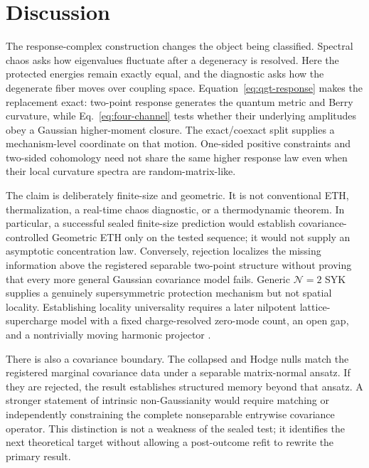 \section{Discussion}
\label{sec:discussion}

The response-complex construction changes the object being classified. Spectral chaos asks how eigenvalues fluctuate after a degeneracy is resolved. Here the protected energies remain exactly equal, and the diagnostic asks how the degenerate fiber moves over coupling space. Equation~\eqref{eq:qgt-response} makes the replacement exact: two-point response generates the quantum metric and Berry curvature, while Eq.~\eqref{eq:four-channel} tests whether their underlying amplitudes obey a Gaussian higher-moment closure. The exact/coexact split supplies a mechanism-level coordinate on that motion. One-sided positive constraints and two-sided cohomology need not share the same higher response law even when their local curvature spectra are random-matrix-like.

The claim is deliberately finite-size and geometric. It is not conventional ETH, thermalization, a real-time chaos diagnostic, or a thermodynamic theorem. In particular, a successful sealed finite-size prediction would establish covariance-controlled Geometric ETH only on the tested sequence; it would not supply an asymptotic concentration law. Conversely, rejection localizes the missing information above the registered separable two-point structure without proving that every more general Gaussian covariance model fails. Generic \(\mathcal N=2\) SYK supplies a genuinely supersymmetric protection mechanism but not spatial locality. Establishing locality universality requires a later nilpotent lattice-supercharge model with a fixed charge-resolved zero-mode count, an open gap, and a nontrivially moving harmonic projector \cite{huijse2009cohomology,zhang2024local}.

There is also a covariance boundary. The collapsed and Hodge nulls match the registered marginal covariance data under a separable matrix-normal ansatz. If they are rejected, the result establishes structured memory beyond that ansatz. A stronger statement of intrinsic non-Gaussianity would require matching or independently constraining the complete nonseparable entrywise covariance operator. This distinction is not a weakness of the sealed test; it identifies the next theoretical target without allowing a post-outcome refit to rewrite the primary result.

